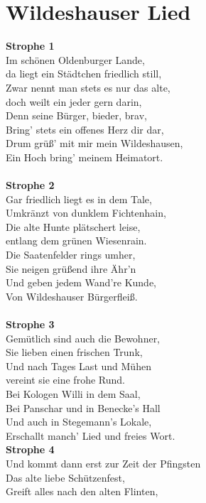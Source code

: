 \documentclass[twoside,8pt]{scrartcl}
\begin{document}
\section{Wildeshauser Lied}
\textbf{Strophe 1}\\
Im schönen Oldenburger Lande,\\
da liegt ein Städtchen friedlich still,\\
Zwar nennt man stets es nur das alte,\\
doch weilt ein jeder gern darin,\\
Denn seine Bürger, bieder, brav,\\
Bring' stets ein offenes Herz dir dar,\\
Drum grüß' mit mir mein Wildeshausen,\\
Ein Hoch bring' meinem Heimatort.\\
\newline\\
\textbf{Strophe 2}\\
Gar friedlich liegt es in dem Tale,\\
Umkränzt von dunklem Fichtenhain,\\
Die alte Hunte plätschert leise,\\
entlang dem grünen Wiesenrain.\\
Die Saatenfelder rings umher,\\
Sie neigen grüßend ihre Ähr'n\\
Und geben jedem Wand're Kunde,\\
Von Wildeshauser Bürgerfleiß.\\
\newline\\
\textbf{Strophe 3}\\
Gemütlich sind auch die Bewohner,\\
Sie lieben einen frischen Trunk,\\
Und nach Tages Last und Mühen\\
vereint sie eine frohe Rund.\\
Bei Kologen Willi in dem Saal,\\
Bei Panschar und in Benecke's Hall\\
Und auch in Stegemann's Lokale,\\
Erschallt manch' Lied und freies Wort.\\\clearpage
\textbf{Strophe 4}\\
Und kommt dann erst zur Zeit der Pfingsten\\
Das alte liebe Schützenfest,\\
Greift alles nach den alten Flinten,\\
\end{document}
